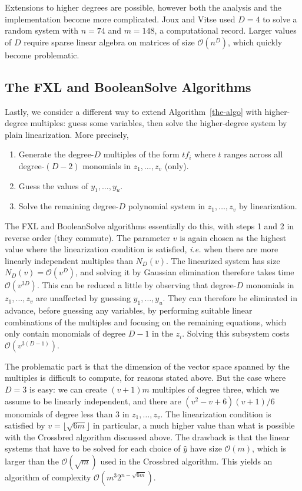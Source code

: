\documentclass[twoside,leqno]{article}
\newcommand{\bigO}[1]{\ensuremath{\mathcal{O}\left( #1 \right)} }
\begin{document}
Extensions to higher degrees are possible, however both the analysis and the
implementation become more complicated. Joux and Vitse used $D=4$ to solve a
random system with $n=74$ and $m=148$, a computational record. Larger values of
$D$ require sparse linear algebra on matrices of size $\bigO{n^D}$, which
quickly become problematic.


\subsection{The \textsf{FXL} and \textsf{BooleanSolve} Algorithms}

Lastly, we consider a different way to extend Algorithm~\ref{the-algo} with
higher-degree multiples: guess some variables, then solve the higher-degree
system by plain linearization. More precisely,

\begin{enumerate}
\item Generate the degree-$D$ multiples of the form $t f_i$ where $t$ ranges
  across all degree-$(D-2)$ monomials in $z_1, \dots, z_v$ (only).
  
\item Guess the values of $y_1, \dots, y_u$.
  
\item Solve the remaining degree-$D$ polynomial system in $z_1, \dots, z_v$ by
  linearization.
\end{enumerate}

The \textsf{FXL} and \textsf{BooleanSolve} algorithms essentially do this, with
steps 1 and 2 in reverse order (they commute). The parameter $v$ is again chosen
as the highest value where the linearization condition is satisfied,
\textit{i.e.} when there are more linearly independent multiples than
$N_D(v)$. The linearized system has size $N_D(v) = \bigO{v^D}$, and solving it
by Gaussian elimination therefore takes time $\bigO{v^{3D}}$. This can be
reduced a little by observing that degree-$D$ monomials in $z_1, \dots, z_v$ are
unaffected by guessing $y_1, \dots, y_u$. They can therefore be eliminated in
advance, before guessing any variables, by performing suitable linear
combinations of the multiples and focusing on the remaining equations, which
only contain monomials of degree $D-1$ in the $z_i$. Solving this subsystem
costs $\bigO{v^{3(D-1)}}$.

The problematic part is that the dimension of the vector space spanned by the
multiples is difficult to compute, for reasons stated above. But the case where
$D=3$ is easy: we can create $(v+1)m$ multiples of degree three, which we assume
to be linearly independent, and there are $(v^2 - v + 6)(v + 1)/6$ monomials of
degree less than 3 in $z_1, \dots, z_v$. The linearization condition is
satisfied by $v = \lfloor \sqrt{6m} \rfloor$ in particular, a much higher value
than what is possible with the \textsf{Crossbred} algorithm discussed above. The
drawback is that the linear systems that have to be solved for each choice of
$\hat y$ have size $\bigO{m}$, which is larger than the $\bigO{\sqrt{m}}$ used
in the \textsf{Crossbred} algorithm. This yields an algorithm of complexity
$\bigO{m^3 2^{n - \sqrt{6m}}}$.
\end{document}
